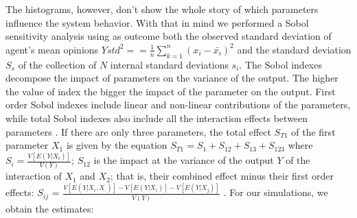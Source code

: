 \documentclass{article}
\begin{document}
The histograms, however, don't show the whole story of which parameters influence the system behavior. With that in mind we performed a
Sobol sensitivity analysis \cite{saltelli2000sensitivity} using as outcome both the observed
standard deviation of agent's mean opinions \(Ystd ^2==
\frac{1}{n}
\sum_{k=1}^{n}
(x_{i}-\bar{x_i})^2  \) and the standard deviation $S_s$ of the collection of $N$ internal standard deviations $s_i$. The Sobol indexes decompose the impact of parameters on
the variance of the output. The higher the value of index the bigger the impact
of the parameter on the output. First order Sobol indexes include linear and
non-linear contributions of the parameters, while total Sobol indexes also
include all the interaction effects between parameters
\cite{ten2016sensitivity}. If there are only three parameters, the total effect
\(S_{T1}\) of the first parameter \(X_1\) is given by the equation \(S_{T1} =
S_1 + S_{12} + S_{13} + S_{123}\) where \(S_i = \frac{V[E(Y|X_i)]}{V(Y)}\);
\(S_{12}\) is the impact at the variance of the output \(Y\) of the interaction
of \(X_{1}\) and \(X_{2}\); that is, their combined effect minus their first
order effects: \(S_{ij}\) = \(\frac{V[E(Y|X_i,X_,)] - V[E(Y|X_i)] -
  V[E(Y|X_j)]}{V(Y)} \) \cite{saltelli2008global}. For our simulations, we
obtain the estimates:
\end{document}
